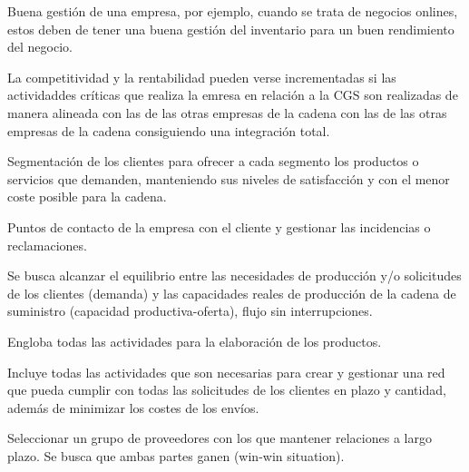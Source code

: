 \documentclass[12pt]{book} %
\begin{document}
\begin{definicion}[Omnichannel]
Buena gestión de una empresa, por ejemplo, cuando se trata de negocios onlines, estos deben de tener una buena gestión del inventario para un buen rendimiento del negocio.
\end{definicion}

La competitividad y la rentabilidad pueden verse incrementadas si las
actividaddes críticas que realiza la emresa en relación a la CGS son
realizadas de manera alineada con las de las otras empresas de la cadena
con las de las otras empresas de la cadena consiguiendo una integración
total.


\begin{definicion}
Segmentación de los clientes para ofrecer a cada segmento los productos o servicios que demanden, manteniendo sus niveles de satisfacción y con el menor coste posible para la cadena.
\end{definicion}

\begin{definicion}
Puntos de contacto de la empresa con el cliente y gestionar las incidencias o reclamaciones.
\end{definicion}

\begin{definicion}
Se busca alcanzar el equilibrio entre las necesidades de producción y/o solicitudes de los clientes (demanda) y las capacidades reales de producción de la cadena de suministro (capacidad productiva-oferta), flujo sin interrupciones.
\end{definicion}

\begin{definicion}
Engloba todas las actividades para la elaboración de los productos.
\end{definicion}

\begin{definicion}
Incluye todas las actividades que son necesarias para crear y gestionar una red que pueda cumplir con todas las solicitudes de los clientes en plazo y cantidad, además de minimizar los costes de los envíos.
\end{definicion}

\begin{definicion}
Seleccionar un grupo de proveedores con los que mantener relaciones a largo plazo. Se busca que ambas partes ganen (win-win situation).
\end{definicion}
\end{document}

